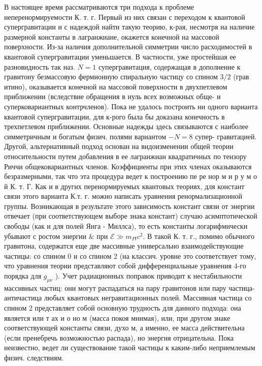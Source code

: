 \documentclass[10pt]{article}
\begin{document}
В настоящее время рассматриваются три подхода к проблеме неперенормируемости К. т. г. Первый из них связан с переходом к квантовой супергравитации и с надеждой найти такую теорию, к-рая, несмотря на наличие размерной константы в лагранжиане, окажется конечной на массовой поверхности. Из-за наличия дополнительной симметрии число расходимостей в квантовой супергравитации уменьшается. В частности, уже простейшая ее разновидность так наз. $N=1$ супергравитация, содержащая в дополнение к гравитону безмассовую фермионную спиральную частицу со спином $3 / 2$ (грав итино), оказывается конечной на массовой поверхности в двухпетлевом приближении (вследствие обращения в нуль всех возможных обще- и суперковариантных контрчленов). Пока не удалось построить ни одного варианта квантовой супергравитации, для к-рого была бы доказана конечность в трехпетлевом приближении. Основные надежды здесь связываются с наиболее симметричным и богатым физич. полями вариантом $-N=8$ супер- гравитацией. Другой, альтернативный подход основан на видоизменении общей теории относительности путем добавления в ее лагранжиан квадратичных по тензору Риччи общековариантных членов. Коэффициенты при этих членах оказываются безразмерными, так что эта процедура ведет к построению пе ре нор м и р у м о й К. т. Г. Как и в других перенормируемых квантовых теориях, для констант связи этого варианта К.т. г. можно написать уравнения ренормализационной группы. Возникающая в результате этого зависимость констант связи от энергии отвечает (при соответствующем выборе знака констант) случаю асимптотической свободы (как и для полей Янга - Миллса), то есть константы логарифмически убывают с ростом энергии \& при $\mathscr{E} \gg m_{P l} c^{2}$. В такой К. т. г., помимо обычного гравитона, содержатся еще две массивные универсально взаимодействующие частицы: со спином 0 и со спином 2 (на классич. уровне это соответствует тому, что уравнения теории представляют собой дифференциальные уравнения 4-го порядка для $g_{\mu \nu}$ ). Учет радиационных поправок приводит к нестабильности массивных частиц: они могут распадаться на пару гравитонов или пару частица-античастица любых квантовых негравитационных полей. Массивная частица со спином 2 представляет собой основную трудность для данного подхода: она является или т ах и о но м (масса покоя мнимая), или, при другом знаке соответствующей константы связи, духо м, а именно, ее масса действительна (если пренебречь возможностью распада), но энергия отрицательна. Пока неизвестно, ведет ли существование такой частицы к каким-либо неприемлемым физич. следствиям.
\end{document}
